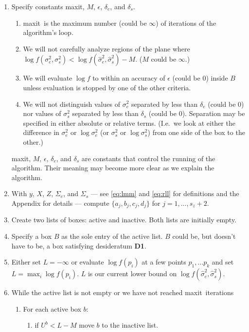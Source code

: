 \documentclass{report}
\newcommand{\textcompute}{\textsf}
\newcommand{\RL}{f}
\newcommand{\logRL}{\log\RL}
\newcommand{\sigssq}{\sigma_s^2}
\newcommand{\sigesq}{\sigma_e^2}
\newcommand{\sshat}{\hat\sigma^2_e,\hat\sigma^2_s}
\newcommand{\logRLss}{\logRL(\sigesq,\sigssq)}
\newcommand{\maxit}{\textcompute{maxit}}
\begin{document}
\begin{enumerate}
\item Specify constants \maxit, $M$, $\epsilon$, $\delta_e$, and $\delta_s$.
	\begin{enumerate}[label=(\alph*)]
	\item \maxit\ is the maximum number (could be $\infty$) of iterations of
		the algorithm's loop.
	\item We will not carefully analyze regions of the plane where
		$\logRLss < \logRL(\sshat) - M$.  ($M$ could be $\infty$.)
	\item We will evaluate $\logRL$ to within an accuracy of $\epsilon$ (could be 0) inside $B$
	         unless evaluation is stopped by one of the other criteria.
	\item We will not distinguish values of $\sigesq$ separated by less
		than $\delta_e$ (could be 0) nor values of $\sigssq$ separated by
		less than $\delta_s$ (could be 0).  Separation may be specified
		in either absolute or relative terms. (I.e.\ we look at either the difference
		in $\sigesq$ or $\log\sigesq$ (or $\sigssq$ or $\log\sigssq$) from one
		side of the box to the other.)
	\end{enumerate}
	\maxit, $M$, $\epsilon$, $\delta_e$, and $\delta_s$ are constants that
	control the running of the algorithm.  Their meaning may become more
	clear as we explain the algorithm.
\item With $y$, $X$, $Z$, $\Sigma_e$, and $\Sigma_s$ --- see \eqref{eq:lmm}
	and \eqref{eq:rll} for definitions and the Appendix for details --- compute $\{a_j, b_j, c_j, d_j\}$ for $j=1,
	\dots, s_z+2$.
\item Create two lists of boxes: active and inactive.  Both lists are initially empty.
\item Specify a box $B$ as the sole entry of the active list.  $B$ could be,
	but doesn't have to be, a box satisfying desideratum \textbf{D1}.
\item Either set $L = -\infty$ or evaluate $\logRL(p_i)$ at a few points
	$p_1, \dots p_k$ and set $L = \max_i\logRL(p_i)$.  $L$ is our current
	lower bound on $\logRL(\sshat)$.
\item While the active list is not empty or we have not reached \maxit\
	iterations
	\begin{enumerate}
	\item For each active box $b$:
		\begin{enumerate}
		\item if $U^b < L-M$ move $b$ to the inactive list.

\end{enumerate}
\end{enumerate}
\end{enumerate}
\end{document}
